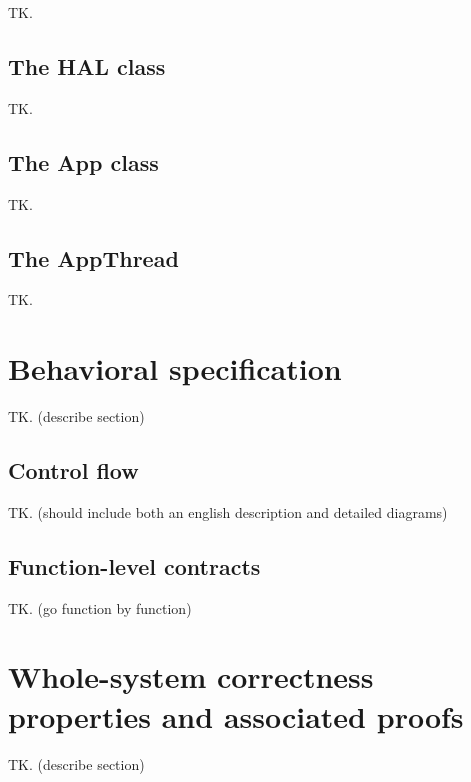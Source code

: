 \documentclass[11pt, oneside]{article}
\begin{document}
            TK.

        \subsection{The HAL class}

            TK.

        \subsection{The App class}
        
            TK.

        \subsection{The AppThread}

            TK.

    \section{Behavioral specification}

        TK. (describe section)

        \subsection{Control flow}

            TK. (should include both an english description and detailed diagrams)

        \subsection{Function-level contracts}

            TK. (go function by function)

    \section{Whole-system correctness properties and associated proofs}

        TK. (describe section)
\end{document}
